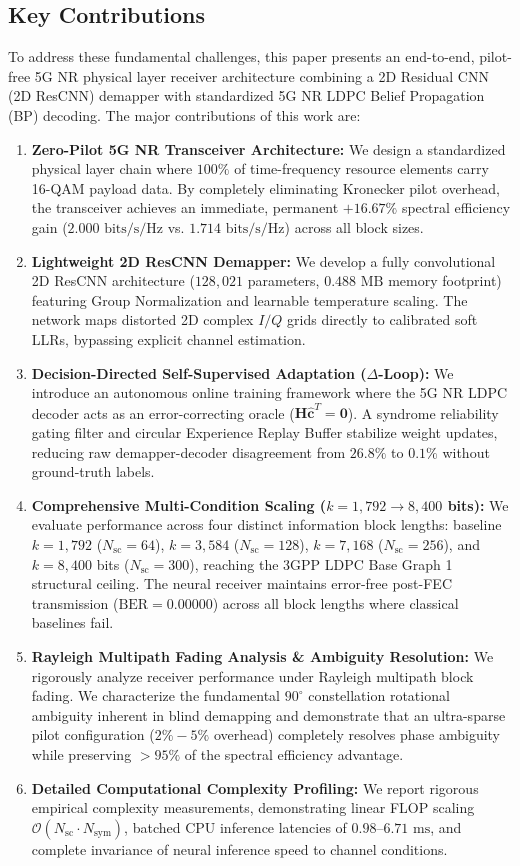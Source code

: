 \documentclass[journal]{IEEEtran}
\begin{document}
\subsection{Key Contributions}
To address these fundamental challenges, this paper presents an end-to-end, pilot-free 5G NR physical layer receiver architecture combining a 2D Residual CNN (2D ResCNN) demapper with standardized 5G NR LDPC Belief Propagation (BP) decoding. The major contributions of this work are:
\begin{enumerate}
    \item \textbf{Zero-Pilot 5G NR Transceiver Architecture:} We design a standardized physical layer chain where $100\%$ of time-frequency resource elements carry 16-QAM payload data. By completely eliminating Kronecker pilot overhead, the transceiver achieves an immediate, permanent $+16.67\%$ spectral efficiency gain ($2.000\text{ bits/s/Hz}$ vs. $1.714\text{ bits/s/Hz}$) across all block sizes.
    \item \textbf{Lightweight 2D ResCNN Demapper:} We develop a fully convolutional 2D ResCNN architecture ($128,021$ parameters, $0.488\text{ MB}$ memory footprint) featuring Group Normalization and learnable temperature scaling. The network maps distorted 2D complex $I/Q$ grids directly to calibrated soft LLRs, bypassing explicit channel estimation.
    \item \textbf{Decision-Directed Self-Supervised Adaptation ($\Delta$-Loop):} We introduce an autonomous online training framework where the 5G NR LDPC decoder acts as an error-correcting oracle ($\mathbf{H}\hat{\mathbf{c}}^T = \mathbf{0}$). A syndrome reliability gating filter and circular Experience Replay Buffer stabilize weight updates, reducing raw demapper-decoder disagreement from $26.8\%$ to $0.1\%$ without ground-truth labels.
    \item \textbf{Comprehensive Multi-Condition Scaling ($k=1,792 \to 8,400$ bits):} We evaluate performance across four distinct information block lengths: baseline $k=1,792$ ($N_{\text{sc}}=64$), $k=3,584$ ($N_{\text{sc}}=128$), $k=7,168$ ($N_{\text{sc}}=256$), and $k=8,400$ bits ($N_{\text{sc}}=300$), reaching the 3GPP LDPC Base Graph 1 structural ceiling. The neural receiver maintains error-free post-FEC transmission ($\text{BER}=0.00000$) across all block lengths where classical baselines fail.
    \item \textbf{Rayleigh Multipath Fading Analysis \& Ambiguity Resolution:} We rigorously analyze receiver performance under Rayleigh multipath block fading. We characterize the fundamental $90^\circ$ constellation rotational ambiguity inherent in blind demapping and demonstrate that an ultra-sparse pilot configuration ($2\%-5\%$ overhead) completely resolves phase ambiguity while preserving $>95\%$ of the spectral efficiency advantage.
    \item \textbf{Detailed Computational Complexity Profiling:} We report rigorous empirical complexity measurements, demonstrating linear FLOP scaling $\mathcal{O}(N_{\text{sc}} \cdot N_{\text{sym}})$, batched CPU inference latencies of $0.98\text{--}6.71\text{ ms}$, and complete invariance of neural inference speed to channel conditions.
\end{enumerate}
\end{document}
